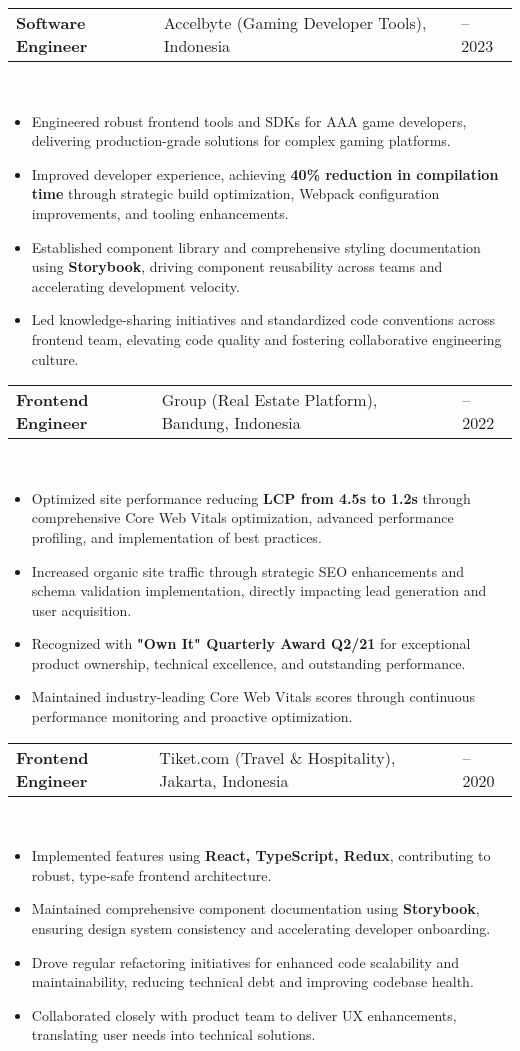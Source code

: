 \documentclass[a4paper, 11pt]{article}
\newcommand{\resumeItem}[1]{
  \item\small{
    {#1 \vspace{-2pt}}
  }
}
\newcommand{\resumeSubheading}[4]{
  \vspace{-2pt}\item
    \begin{tabularx}{0.987\textwidth}[t]{
  >{\raggedright\arraybackslash}X
  >{\centering\arraybackslash}X
  >{\raggedleft\arraybackslash}X }
      \textbf{#1} & #2 & #3 \\
    \end{tabularx}
    \textit{\small#4}\\
    \vspace{-7pt}
}
\newcommand{\resumeItemListStart}{\begin{itemize}[leftmargin=0.22in]}
\newcommand{\resumeItemListEnd}{\end{itemize}\vspace{-20pt}}
\begin{document}
        \resumeSubheading
            {Software Engineer}{Accelbyte (Gaming Developer Tools), Indonesia}{2022 -- 2023}{}
            \resumeItemListStart
                \resumeItem{Engineered robust frontend tools and SDKs for AAA game developers, delivering production-grade solutions for complex gaming platforms.}
                \resumeItem{Improved developer experience, achieving \textbf{40\% reduction in compilation time} through strategic build optimization, Webpack configuration improvements, and tooling enhancements.}
                \resumeItem{Established component library and comprehensive styling documentation using \textbf{Storybook}, driving component reusability across teams and accelerating development velocity.}
                \resumeItem{Led knowledge-sharing initiatives and standardized code conventions across frontend team, elevating code quality and fostering collaborative engineering culture.}
            \resumeItemListEnd

        \resumeSubheading
            {Frontend Engineer}{99 Group (Real Estate Platform), Bandung, Indonesia}{2020 -- 2022}{}
            \resumeItemListStart
                \resumeItem{Optimized site performance reducing \textbf{LCP from 4.5s to 1.2s} through comprehensive Core Web Vitals optimization, advanced performance profiling, and implementation of best practices.}
                \resumeItem{Increased organic site traffic through strategic SEO enhancements and schema validation implementation, directly impacting lead generation and user acquisition.}
                \resumeItem{Recognized with \textbf{"Own It" Quarterly Award Q2/21} for exceptional product ownership, technical excellence, and outstanding performance.}
                \resumeItem{Maintained industry-leading Core Web Vitals scores through continuous performance monitoring and proactive optimization.}
            \resumeItemListEnd

        \resumeSubheading
            {Frontend Engineer}{Tiket.com (Travel \& Hospitality), Jakarta, Indonesia}{2019 -- 2020}{}
            \resumeItemListStart
                \resumeItem{Implemented features using \textbf{React, TypeScript, Redux}, contributing to robust, type-safe frontend architecture.}
                \resumeItem{Maintained comprehensive component documentation using \textbf{Storybook}, ensuring design system consistency and accelerating developer onboarding.}
                \resumeItem{Drove regular refactoring initiatives for enhanced code scalability and maintainability, reducing technical debt and improving codebase health.}
                \resumeItem{Collaborated closely with product team to deliver UX enhancements, translating user needs into technical solutions.}
            \resumeItemListEnd
\end{document}
